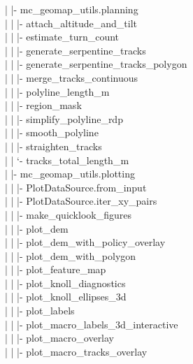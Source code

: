 \documentclass[11pt]{article}
\begin{document}
\textcolor{TreeLevelTwo}{|  |- mc\_geomap\_utils.planning}\\
\textcolor{TreeLevelThree}{|  |  |- attach\_altitude\_and\_tilt}\\
\textcolor{TreeLevelThree}{|  |  |- estimate\_turn\_count}\\
\textcolor{TreeLevelThree}{|  |  |- generate\_serpentine\_tracks}\\
\textcolor{TreeLevelThree}{|  |  |- generate\_serpentine\_tracks\_polygon}\\
\textcolor{TreeLevelThree}{|  |  |- merge\_tracks\_continuous}\\
\textcolor{TreeLevelThree}{|  |  |- polyline\_length\_m}\\
\textcolor{TreeLevelThree}{|  |  |- region\_mask}\\
\textcolor{TreeLevelThree}{|  |  |- simplify\_polyline\_rdp}\\
\textcolor{TreeLevelThree}{|  |  |- smooth\_polyline}\\
\textcolor{TreeLevelThree}{|  |  |- straighten\_tracks}\\
\textcolor{TreeLevelThree}{|  |  `- tracks\_total\_length\_m}\\
\textcolor{TreeLevelTwo}{|  |- mc\_geomap\_utils.plotting}\\
\textcolor{TreeLevelThree}{|  |  |- PlotDataSource.from\_input}\\
\textcolor{TreeLevelThree}{|  |  |- PlotDataSource.iter\_xy\_pairs}\\
\textcolor{TreeLevelThree}{|  |  |- make\_quicklook\_figures}\\
\textcolor{TreeLevelThree}{|  |  |- plot\_dem}\\
\textcolor{TreeLevelThree}{|  |  |- plot\_dem\_with\_policy\_overlay}\\
\textcolor{TreeLevelThree}{|  |  |- plot\_dem\_with\_polygon}\\
\textcolor{TreeLevelThree}{|  |  |- plot\_feature\_map}\\
\textcolor{TreeLevelThree}{|  |  |- plot\_knoll\_diagnostics}\\
\textcolor{TreeLevelThree}{|  |  |- plot\_knoll\_ellipses\_3d}\\
\textcolor{TreeLevelThree}{|  |  |- plot\_labels}\\
\textcolor{TreeLevelThree}{|  |  |- plot\_macro\_labels\_3d\_interactive}\\
\textcolor{TreeLevelThree}{|  |  |- plot\_macro\_overlay}\\
\textcolor{TreeLevelThree}{|  |  |- plot\_macro\_tracks\_overlay}\\
\end{document}
